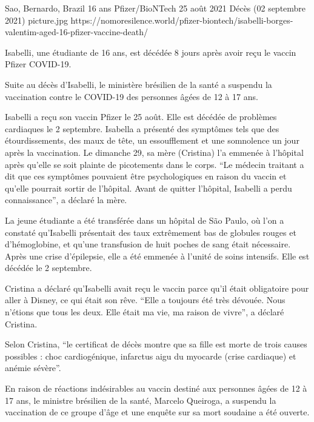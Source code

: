 {Sao, Bernardo, Brazil}
{16 ans}
{Pfizer/BioNTech}
{25 août 2021}
{Décès (02 septembre 2021)}
{picture.jpg}
{https://nomoresilence.world/pfizer-biontech/isabelli-borges-valentim-aged-16-pfizer-vaccine-death/}
{

Isabelli, une étudiante de 16 ans, est décédée 8 jours après avoir reçu le
vaccin Pfizer COVID-19.

Suite au décès d'Isabelli, le ministère brésilien de la santé a suspendu la
vaccination contre le COVID-19 des personnes âgées de 12 à 17 ans.

Isabelli a reçu son vaccin Pfizer le 25 août. Elle est décédée de problèmes
cardiaques le 2 septembre. Isabella a présenté des symptômes tels que des
étourdissements, des maux de tête, un essoufflement et une somnolence un jour
après la vaccination. Le dimanche 29, sa mère (Cristina) l'a emmenée à l'hôpital
après qu'elle se soit plainte de picotements dans le corps. “Le médecin traitant
a dit que ces symptômes pouvaient être psychologiques en raison du vaccin et
qu'elle pourrait sortir de l'hôpital. Avant de quitter l'hôpital, Isabelli a
perdu connaissance”, a déclaré la mère.

La jeune étudiante a été transférée dans un hôpital de São Paulo, où l'on a
constaté qu'Isabelli présentait des taux extrêmement bas de globules rouges et
d'hémoglobine, et qu'une transfusion de huit poches de sang était
nécessaire. Après une crise d'épilepsie, elle a été emmenée à l'unité de soins
intensifs. Elle est décédée le 2 septembre.

Cristina a déclaré qu'Isabelli avait reçu le vaccin parce qu'il était
obligatoire pour aller à Disney, ce qui était son rêve. “Elle a toujours été
très dévouée. Nous n'étions que tous les deux. Elle était ma vie, ma raison de
vivre”, a déclaré Cristina.

Selon Cristina, “le certificat de décès montre que sa fille est morte de trois
causes possibles : choc cardiogénique, infarctus aigu du myocarde (crise
cardiaque) et anémie sévère”.

En raison de réactions indésirables au vaccin destiné aux personnes âgées de 12
à 17 ans, le ministre brésilien de la santé, Marcelo Queiroga, a suspendu la
vaccination de ce groupe d'âge et une enquête sur sa mort soudaine a été
ouverte.

}
